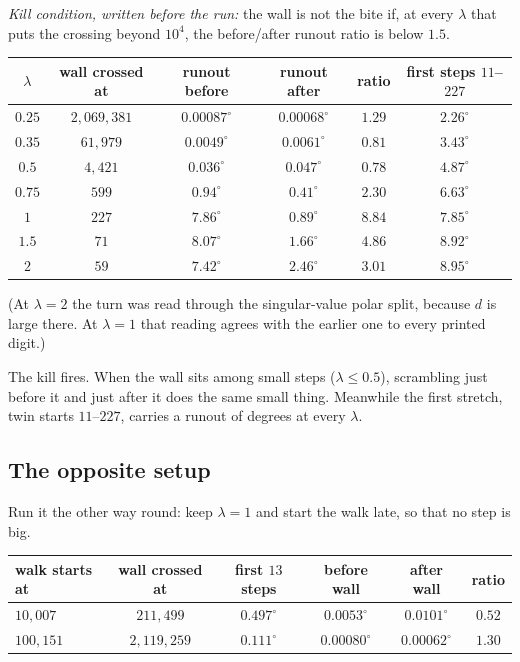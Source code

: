 \emph{Kill condition, written before the run:} the wall is not the bite if, at every $\lambda$ that puts the crossing beyond $10^4$, the before/after runout ratio is below $1.5$.

\begin{center}\begin{tabular}{cccccc}
\toprule
$\lambda$ & wall crossed at & runout before & runout after & ratio & first steps $11$--$227$\\
\midrule
$0.25$ & $2{,}069{,}381$ & $0.00087^\circ$ & $0.00068^\circ$ & $1.29$ & $2.26^\circ$\\
$0.35$ & $61{,}979$ & $0.0049^\circ$ & $0.0061^\circ$ & $0.81$ & $3.43^\circ$\\
$0.5$ & $4{,}421$ & $0.036^\circ$ & $0.047^\circ$ & $0.78$ & $4.87^\circ$\\
$0.75$ & $599$ & $0.94^\circ$ & $0.41^\circ$ & $2.30$ & $6.63^\circ$\\
$1$ & $227$ & $7.86^\circ$ & $0.89^\circ$ & $8.84$ & $7.85^\circ$\\
$1.5$ & $71$ & $8.07^\circ$ & $1.66^\circ$ & $4.86$ & $8.92^\circ$\\
$2$ & $59$ & $7.42^\circ$ & $2.46^\circ$ & $3.01$ & $8.95^\circ$\\
\bottomrule
\end{tabular}\end{center}
(At $\lambda=2$ the turn was read through the singular-value polar split, because $d$ is large there. At $\lambda=1$ that reading agrees with the earlier one to every printed digit.)

The kill fires. When the wall sits among small steps ($\lambda\le0.5$), scrambling just before it and just after it does the same small thing. Meanwhile the first stretch, twin starts $11$--$227$, carries a runout of degrees at every $\lambda$.

\subsection{The opposite setup} 
Run it the other way round: keep $\lambda=1$ and start the walk late, so that no step is big.

\begin{center}\begin{tabular}{lccccc}
\toprule
walk starts at & wall crossed at & first $13$ steps & before wall & after wall & ratio\\
\midrule
$10{,}007$ & $211{,}499$ & $0.497^\circ$ & $0.0053^\circ$ & $0.0101^\circ$ & $0.52$\\
$100{,}151$ & $2{,}119{,}259$ & $0.111^\circ$ & $0.00080^\circ$ & $0.00062^\circ$ & $1.30$\\
\bottomrule
\end{tabular}\end{center}

